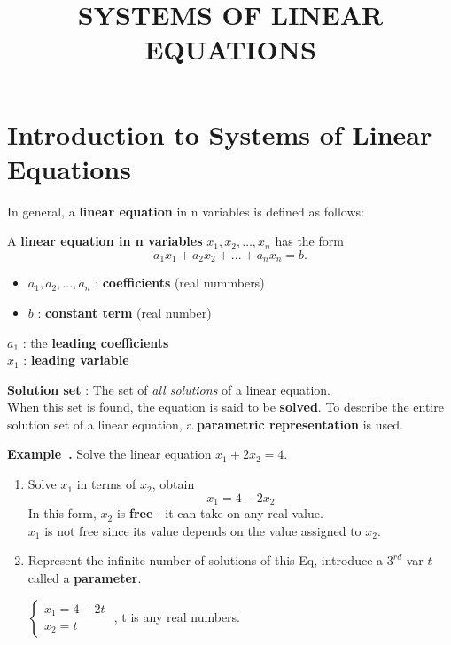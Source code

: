 \documentclass{article}
\title{SYSTEMS OF LINEAR EQUATIONS}
\date{}
\newcounter{example}[section]
\newenvironment{example}[1][]{\refstepcounter{example}\par\medskip
   \noindent \textbf{Example~\theexample. #1} \rmfamily}{\medskip}
\begin{document}
    \section{Introduction to Systems of Linear Equations}
    
    In general, a \textbf{linear equation} in n variables is defined as follows:
    \begin{tcolorbox}
        A \textbf{linear equation in n variables} $x_1,x_2,\dots,x_n$ has the form
        \begin{equation}
            a_1x_1 + a_2x_2 + ... + a_nx_n = b.
        \end{equation}
        \begin{itemize}
            \item         $a_1, a_2, \dots, a_n$ : \textbf{coefficients} (real nummbers)
            \item         $b$ :  \textbf{constant term} (real number)
        \end{itemize}
        
        $a_1$ : the \textbf{leading coefficients}\\
        $x_1$ : \textbf{leading variable}
    \end{tcolorbox}
    
    \textbf{Solution set} : The set of \textit{all solutions} of a linear equation.\\
    When this set is found, the equation is said to be \textbf{solved}. To describe the entire solution set
    of a linear equation, a \textbf{parametric representation} is used.

    \begin{example}
        Solve the linear equation $x_1 + 2x_2 = 4$.
        \begin{enumerate}
            \item Solve $x_1$ in terms of $x_2$, obtain 
                \[x_1 = 4 - 2x_2\]
                In this form, $x_2$ is \textbf{free} - it can take on any real value.\\
                $x_1$ is not free since its value depends on the value assigned to $x_2$.
            \item Represent the infinite number of solutions of this Eq, introduce a $3^{rd}$ var $t$ 
                called a \textbf{parameter}.

                $ \begin{cases}{}
                    x_1 = 4 - 2t\\
                    x_2 = t
                \end{cases}$
                , t is any real numbers.
        \end{enumerate}
    \end{example}
\end{document}
